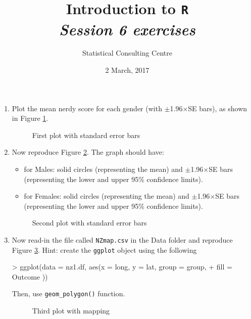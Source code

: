 \documentclass[12pt,a4paper]{article}
\begin{document}

\setlength\parindent{0cm}
\title{\Large{\textbf{Introduction to \texttt{R}}}\\
\textit{Session 6 exercises}}
\author{Statistical Consulting Centre}
\date{2 March, 2017}
\maketitle
 
 
\begin{enumerate}
\item Plot the mean nerdy score for each gender (with $\pm$1.96$\times$SE bars), as shown in Figure \ref{fig:stder1}. 
\begin{figure}[h]   
 \centering
\caption{First plot with standard error bars}
  \label{fig:stder1}
\end{figure}
\newpage
\item Now reproduce Figure \ref{fig:stder2}. The graph should have:
\begin{itemize}
\item for Males: solid circles (representing the mean) and $\pm$1.96$\times$SE bars (representing the lower and upper 95\% confidence limits).
\item for Females: solid circles (representing the mean) and $\pm$1.96$\times$SE bars (representing the lower and upper 95\% confidence limits).
\end{itemize}
\begin{figure}[h]   
 \centering
\caption{Second plot with standard error bars}
  \label{fig:stder2}
\end{figure}

\newpage
\item Now read-in the file called \verb|NZmap.csv| in the Data folder and reproduce Figure \ref{fig:stder3}. Hint: create the \texttt{ggplot} object using the following
\begin{Schunk}
\begin{Sinput}
> ggplot(data = nz1.df, aes(x = long, y = lat, group = group, 
+                            fill = Outcome ))
\end{Sinput}
\end{Schunk}
Then, use \verb|geom_polygon()| function.  

\begin{figure}[h]   
 \centering

\caption{Third plot with mapping}
  \label{fig:stder3}
\end{figure}

\end{enumerate}
\end{document}
